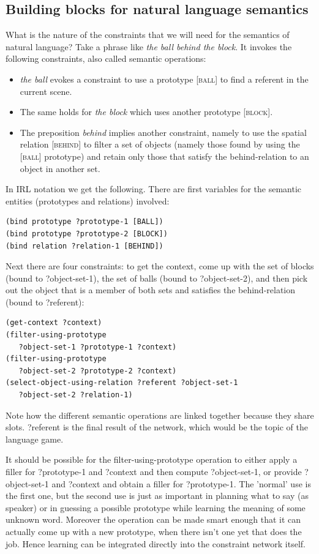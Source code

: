 \subsection{Building blocks for natural language semantics}

What is the nature of the constraints that we will need for the semantics of natural language? 
Take a phrase like \textit{the ball behind the block}. It invokes the following constraints, also called 
semantic operations: 
\begin{itemize}
\item \textit{the ball} evokes a constraint to use a prototype [\textsc{ball}] to find a referent in the current scene.
\item The same holds for \textit{the block} which uses another prototype [\textsc{block}]. 
\item The preposition \textit{behind} implies another constraint, namely to use the spatial relation [\textsc{behind}] to filter a 
set of objects (namely those found by using the [\textsc{ball}] prototype) and retain only those that satisfy the behind-relation 
to an object in another set. 
\end{itemize} 

In IRL notation we get the following. There are first variables for the semantic entities (prototypes and relations) 
involved:
\begin{verbatim}
(bind prototype ?prototype-1 [BALL])
(bind prototype ?prototype-2 [BLOCK])
(bind relation ?relation-1 [BEHIND])
\end{verbatim}
Next there are four constraints: to get the context, come up with the set of blocks
(bound to ?object-set-1), the set of balls (bound to ?object-set-2), and then pick out the object 
that is a member of both sets and satisfies the behind-relation (bound to ?referent): 
\begin{verbatim}
(get-context ?context)
(filter-using-prototype 
   ?object-set-1 ?prototype-1 ?context)
(filter-using-prototype 
   ?object-set-2 ?prototype-2 ?context)
(select-object-using-relation ?referent ?object-set-1
   ?object-set-2 ?relation-1)
\end{verbatim}
Note how the different semantic operations are linked together because they share slots.
?referent is the final result of the network, which would be the topic of the language game. 

It should be possible for the filter-using-prototype operation
to either apply a filler for ?prototype-1 and 
?context and then compute ?object-set-1, or provide ?object-set-1 and ?context and obtain a filler for ?prototype-1. 
The 'normal' use is the first one, but the second use is just as important in planning what to
say (as speaker) or in guessing a possible prototype while learning the meaning of some unknown word. 
Moreover the  operation can be made smart enough that it can actually come up with
a new prototype, when there isn't one yet that does the job. Hence learning can be 
integrated directly into the constraint network itself. 

